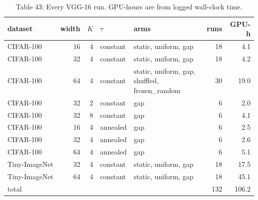 \documentclass{article}
\begin{document}
\begin{table}
\caption{Table 43: Every VGG-16 run. GPU-hours are from logged wall-clock time.}

\begin{tabular}{l r r l l r r}
\toprule
dataset & width & $K$ & $\tau$ & arms & runs & GPU-h \\
\midrule
CIFAR‑100 & 16 & 4 & constant & static, uniform, gap & 18 & 4.1 \\
CIFAR‑100 & 32 & 4 & constant & static, uniform, gap & 18 & 4.2 \\
CIFAR‑100 & 64 & 4 & constant & static, uniform, gap, shuffled, frozen\_random & 30 & 19.0 \\
CIFAR‑100 & 32 & 2 & constant & gap & 6 & 2.0 \\
CIFAR‑100 & 32 & 8 & constant & gap & 6 & 4.1 \\
CIFAR‑100 & 16 & 4 & annealed & gap & 6 & 2.5 \\
CIFAR‑100 & 32 & 4 & annealed & gap & 6 & 2.6 \\
CIFAR‑100 & 64 & 4 & annealed & gap & 6 & 5.1 \\
Tiny‑ImageNet & 32 & 4 & constant & static, uniform, gap & 18 & 17.5 \\
Tiny‑ImageNet & 64 & 4 & constant & static, uniform, gap & 18 & 45.1 \\
\midrule \multicolumn{5}{l}{total} & 132 & 106.2 \\
\bottomrule
\end{tabular}
\end{table}
\end{document}

